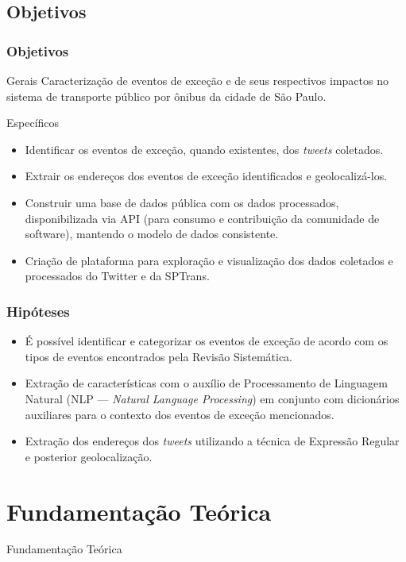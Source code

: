 \documentclass{beamer}
\begin{document}
\subsection{Objetivos}
\begin{frame}
\frametitle{Objetivos}
\begin{block}{Gerais}
Caracterização de eventos de exceção e de seus respectivos impactos no sistema de transporte público por ônibus da cidade de São Paulo.
\end{block}
\begin{block}{Específicos}
\begin{itemize}
    \item Identificar os eventos de exceção, quando existentes, dos \textit{tweets} coletados.
     \item Extrair os endereços dos eventos de exceção identificados e geolocalizá-los.
		\item Construir uma base de dados pública com os dados processados, disponibilizada via API (para consumo e contribuição da comunidade de software), mantendo o modelo de dados consistente.
\item Criação de plataforma para exploração e visualização dos dados coletados e processados do Twitter e da SPTrans.
\end{itemize}
\end{block}
\end{frame}
\begin{frame}
\frametitle{Hipóteses}

\begin{itemize}

\item É possível identificar e categorizar os eventos de exceção de acordo com os tipos de eventos encontrados pela Revisão Sistemática.

\item Extração de características com o auxílio de Processamento de Linguagem Natural (NLP --- \textit{Natural Language Processing}) em conjunto com dicionários auxiliares para o contexto dos eventos de exceção mencionados.

\item Extração dos endereços dos \textit{tweets} utilizando a técnica de Expressão Regular e posterior geolocalização.
\end{itemize}

\end{frame}
\section{Fundamentação Teórica}
\begin{frame}
\Huge{\centerline{Fundamentação Teórica}}
\end{frame}
\end{document}
